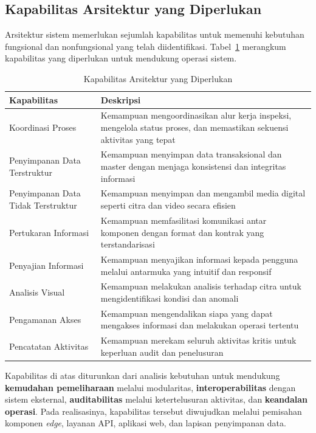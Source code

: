 \subsection{Kapabilitas Arsitektur yang Diperlukan}
\label{subsec:kapabilitas-arsitektur}

Arsitektur sistem memerlukan sejumlah kapabilitas untuk memenuhi kebutuhan fungsional dan nonfungsional yang telah diidentifikasi. Tabel~\ref{tbl:architecture_capabilities} merangkum kapabilitas yang diperlukan untuk mendukung operasi sistem.

\begin{table}[ht]
  \centering
  \small
  \caption{Kapabilitas Arsitektur yang Diperlukan}
  \label{tbl:architecture_capabilities}
  \begin{tabular}{p{} p{}}
    \toprule
    \textbf{Kapabilitas} & \textbf{Deskripsi} \\
    \midrule
    Koordinasi Proses & Kemampuan mengoordinasikan alur kerja inspeksi, mengelola status proses, dan memastikan sekuensi aktivitas yang tepat \\
    Penyimpanan Data Terstruktur & Kemampuan menyimpan data transaksional dan master dengan menjaga konsistensi dan integritas informasi \\
    Penyimpanan Data Tidak Terstruktur & Kemampuan menyimpan dan mengambil media digital seperti citra dan video secara efisien \\
    Pertukaran Informasi & Kemampuan memfasilitasi komunikasi antar komponen dengan format dan kontrak yang terstandarisasi \\
    Penyajian Informasi & Kemampuan menyajikan informasi kepada pengguna melalui antarmuka yang intuitif dan responsif \\
    Analisis Visual & Kemampuan melakukan analisis terhadap citra untuk mengidentifikasi kondisi dan anomali \\
    Pengamanan Akses & Kemampuan mengendalikan siapa yang dapat mengakses informasi dan melakukan operasi tertentu \\
    Pencatatan Aktivitas & Kemampuan merekam seluruh aktivitas kritis untuk keperluan audit dan penelusuran \\
    \bottomrule
  \end{tabular}
\end{table}

\FloatBarrier

Kapabilitas di atas diturunkan dari analisis kebutuhan untuk mendukung \textbf{kemudahan pemeliharaan} melalui modularitas, \textbf{interoperabilitas} dengan sistem eksternal, \textbf{auditabilitas} melalui ketertelusuran aktivitas, dan \textbf{keandalan operasi}. Pada realisasinya, kapabilitas tersebut diwujudkan melalui pemisahan komponen \textit{edge}, layanan API, aplikasi web, dan lapisan penyimpanan data.

